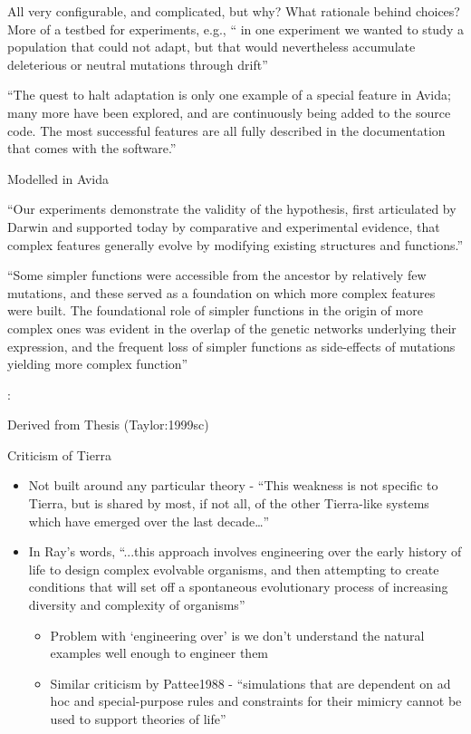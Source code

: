 All very configurable, and complicated, but why? What rationale behind
choices? More of a testbed for experiments, e.g., `` in one experiment
we wanted to study a population that could not adapt, but that would
nevertheless accumulate deleterious or neutral mutations through
drift''


``The quest to halt adaptation is only one example of a special
feature in Avida; many more have been explored, and are continuously
being added to the source code. The most successful features are all
fully described in the documentation that comes with the software.''


\autocite{Lenski2003}


Modelled in Avida


``Our experiments demonstrate the validity of the hypothesis, first
articulated by Darwin and supported today by comparative and
experimental evidence, that complex features generally evolve by
modifying existing structures and functions.''



``Some simpler functions were accessible from the ancestor by
relatively few mutations, and these served as a foundation on which
more complex features were built. The foundational role of simpler
functions in the origin of more complex ones was evident in the
overlap of the genetic networks underlying their expression, and the
frequent loss of simpler functions as side-effects of mutations
yielding more complex function''


\autocite{Taylor2001}:


Derived from Thesis (Taylor:1999sc)

Criticism of Tierra
\begin{itemize}
	\item
	
	Not built around any particular theory - ``This weakness is not
	specific to Tierra, but is shared by most, if not all, of the other
	Tierra-like systems which have emerged over the last
	decade\ldots{}''
	
	\item
	
	In Ray's words, ``...this approach involves engineering over the
	early history of life to design complex evolvable organisms, and
	then attempting to create conditions that will set off a spontaneous
	evolutionary process of increasing diversity and complexity of
	organisms''
	
	
	\begin{itemize}
		\item
		
		Problem with `engineering over' is we don't understand the natural
		examples well enough to engineer them
		
		\item
		
		Similar criticism by Pattee1988 - ``simulations that are dependent
		on ad hoc and special-purpose rules and constraints for their
		mimicry cannot be used to support theories of life''
		
	\end{itemize}
\end{itemize}


